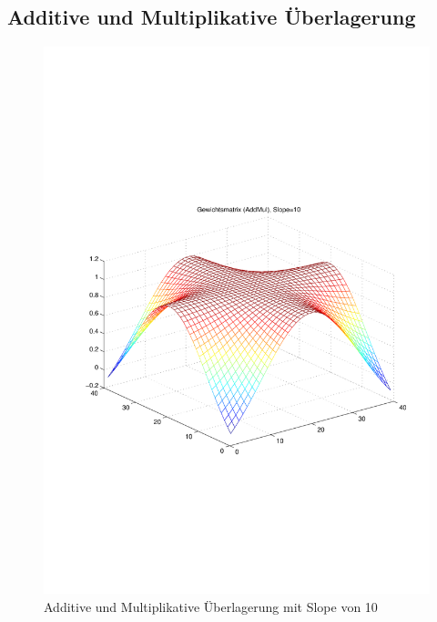 \subsection{Additive und Multiplikative Überlagerung}
\begin{figure}[hbt]
	\begin{minipage}{0.5 \textwidth}
		\includegraphics[width=\textwidth]{./Bilder/Auswertung/Gewichtsmatrix/Gewichtsmatrix_AddMul_Slope_10}
		\caption{Additive und Multiplikative Überlagerung mit Slope von 10}
		\label{AddMul210}
	\end{minipage}
	\hfill
	\begin{minipage}{0.5 \textwidth}

\end{minipage}
\end{figure}
